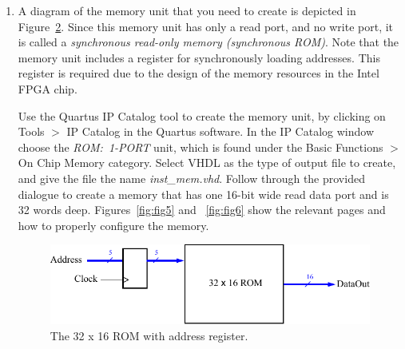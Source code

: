 \documentclass[epsfig,10pt,fullpage]{article}
\begin{document}
\begin{enumerate}
\begin{figure}[h]
\begin{center}
\begin{minipage}[t]{15 cm}
\begin{lstlisting}[name=proc]
ARCHITECTURE Behavior OF part2 IS
   |$\ldots$| declare components and signals
BEGIN
   Resetn <= SW(0);
   MClock <= KEY(0);
   PClock <= KEY(1);
   Run <= SW(9);
   U1: proc PORT MAP (DIN, Resetn, PClock, Run, Done);
   LEDR(0) <= Done;
   LEDR(9) <= Run;

   U2: inst_mem PORT MAP (pc, MClock, DIN);
   U3: count5 PORT MAP (Resetn, MClock, pc);
END Behavior;
|$\ldots$|
ENTITY count5 IS 
PORT ( Resetn, Clock   : IN   STD_LOGIC;
       Q               : OUT  STD_LOGIC_VECTOR(4 DOWNTO 0));
END count5;

ARCHITECTURE Behavior OF count5 IS
   SIGNAL Count : STD_LOGIC_VECTOR(4 DOWNTO 0); 
BEGIN
   PROCESS (Clock, Resetn)
   BEGIN
         IF (Resetn = '0') THEN
            Count <= "00000";
         ELSIF (rising_edge(Clock)) THEN
            Count <= Count + '1';
         END IF;
   END PROCESS;
   Q <= Count;
END Behavior;
\end{lstlisting}
\end{minipage}
\caption{VHDL code for the top-level entity.}
\label{fig:procmem}
\end{center}
\end{figure}

\item
A diagram of the memory unit that you need to create is depicted in Figure~\ref{fig:fig_ROM}.
Since this memory unit has only a read port, and no write port, it is called a {\it synchronous 
read-only memory (synchronous ROM)}. Note that the memory unit includes a register for 
synchronously loading addresses. This register is required due to the design of the memory 
resources in the Intel FPGA chip. 

Use the Quartus IP Catalog tool to create the memory unit, by clicking on 
{\sf Tools} $>$ {\sf IP Catalog} in the Quartus software. In the IP Catalog window 
choose the {\it ROM:~1-PORT} unit,
which is found under the {\sf Basic Functions $>$  On Chip Memory} category.  
Select {\sf VHDL} as the type of output file to create, and give the file the name 
{\it inst\_mem.vhd}.
Follow through the provided dialogue to create a memory that has one 16-bit 
wide read data port and is 32 words deep. Figures~\ref{fig:fig5} and ~\ref{fig:fig6} show the 
relevant pages and how to properly configure the memory. 

\begin{figure}[t]
	\begin{center}
		\includegraphics[]{figures/figure_ROM.pdf}
	\end{center}
	\caption{The 32 {\sf x} 16 ROM with address register.}
	\label{fig:fig_ROM}
\end{figure}


\end{enumerate}
\end{document}
